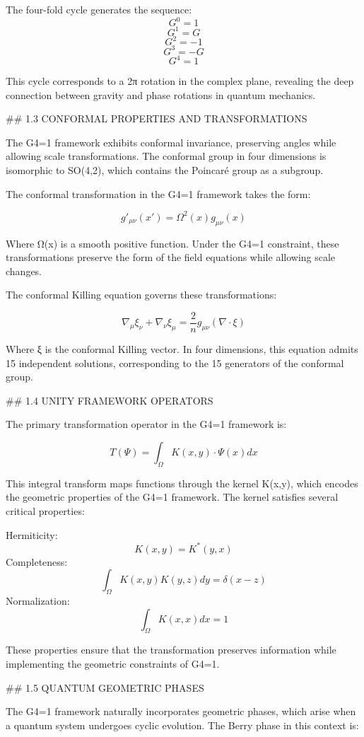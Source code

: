 The four-fold cycle generates the sequence:
$$G^0 = 1$$
$$G^1 = G$$
$$G^2 = -1$$
$$G^3 = -G$$
$$G^4 = 1$$

This cycle corresponds to a 2π rotation in the complex plane, revealing the deep connection between gravity and phase rotations in quantum mechanics.

## 1.3 CONFORMAL PROPERTIES AND TRANSFORMATIONS

The G4=1 framework exhibits conformal invariance, preserving angles while allowing scale transformations. The conformal group in four dimensions is isomorphic to SO(4,2), which contains the Poincaré group as a subgroup.

The conformal transformation in the G4=1 framework takes the form:

$$g'_{\mu\nu}(x') = \Omega^2(x)g_{\mu\nu}(x)$$

Where Ω(x) is a smooth positive function. Under the G4=1 constraint, these transformations preserve the form of the field equations while allowing scale changes.

The conformal Killing equation governs these transformations:

$$\nabla_\mu\xi_\nu + \nabla_\nu\xi_\mu = \frac{2}{n}g_{\mu\nu}(\nabla \cdot \xi)$$

Where ξ is the conformal Killing vector. In four dimensions, this equation admits 15 independent solutions, corresponding to the 15 generators of the conformal group.

## 1.4 UNITY FRAMEWORK OPERATORS

The primary transformation operator in the G4=1 framework is:

$$T(\Psi) = \int_\Omega K(x,y) \cdot \Psi(x)dx$$

This integral transform maps functions through the kernel K(x,y), which encodes the geometric properties of the G4=1 framework. The kernel satisfies several critical properties:

Hermiticity: $$K(x,y) = K^*(y,x)$$
Completeness: $$\int_\Omega K(x,y)K(y,z)dy = \delta(x-z)$$
Normalization: $$\int_\Omega K(x,x)dx = 1$$

These properties ensure that the transformation preserves information while implementing the geometric constraints of G4=1.

## 1.5 QUANTUM GEOMETRIC PHASES

The G4=1 framework naturally incorporates geometric phases, which arise when a quantum system undergoes cyclic evolution. The Berry phase in this context is:


